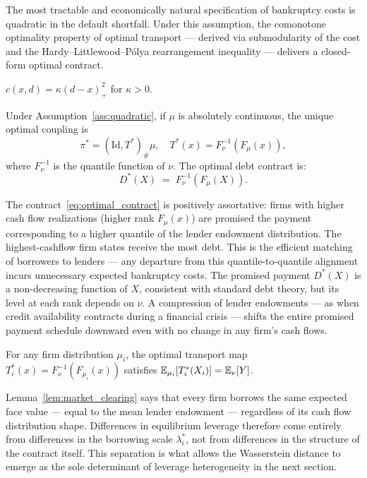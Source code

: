 The most tractable and economically natural specification of bankruptcy costs is quadratic in the default shortfall. Under this assumption, the comonotone optimality property of optimal transport --- derived via submodularity of the cost and the Hardy--Littlewood--P\'{o}lya rearrangement inequality --- delivers a closed-form optimal contract.

\begin{assumption}
\label{ass:quadratic}
$c(x,d) = \kappa(d-x)_+^2$ for $\kappa > 0$.
\end{assumption}

\begin{theorem}
\label{thm:optimal_contract}
Under Assumption~\ref{ass:quadratic}, if $\mu$ is absolutely continuous, the unique optimal coupling is
\[
  \pi^* = (\mathrm{Id}, T^*)_\#\mu, \quad T^*(x) = F_\nu^{-1}(F_\mu(x)),
\]
where $F_\nu^{-1}$ is the quantile function of $\nu$. The optimal debt contract is:
\begin{equation}
  D^*(X) \;=\; F_\nu^{-1}(F_\mu(X)).
  \label{eq:optimal_contract}
\end{equation}
\end{theorem}

The contract~\eqref{eq:optimal_contract} is positively assortative: firms with higher cash flow realizations (higher rank $F_\mu(x)$) are promised the payment corresponding to a higher quantile of the lender endowment distribution. The highest-cashflow firm states receive the most debt. This is the efficient matching of borrowers to lenders — any departure from this quantile-to-quantile alignment incurs unnecessary expected bankruptcy costs. The promised payment $D^*(X)$ is a non-decreasing function of $X$, consistent with standard debt theory, but its level at each rank depends on $\nu$. A compression of lender endowments — as when credit availability contracts during a financial crisis — shifts the entire promised payment schedule downward even with no change in any firm's cash flows.

\begin{lemma}
\label{lem:market_clearing}
For any firm distribution $\mu_i$, the optimal transport map $T_i^*(x) = F_\nu^{-1}(F_{\mu_i}(x))$ satisfies $\mathbb{E}_{\mu_i}[T_i^*(X_i)] = \mathbb{E}_\nu[Y]$.
\end{lemma}

Lemma~\ref{lem:market_clearing} says that every firm borrows the same expected face value — equal to the mean lender endowment — regardless of its cash flow distribution shape. Differences in equilibrium leverage therefore come entirely from differences in the borrowing scale $\lambda_i^*$, not from differences in the structure of the contract itself. This separation is what allows the Wasserstein distance to emerge as the sole determinant of leverage heterogeneity in the next section.
